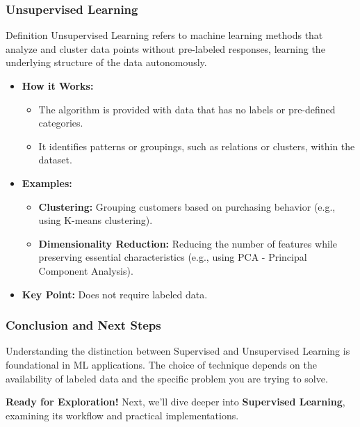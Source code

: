 \documentclass[aspectratio=169]{beamer}
\begin{document}
\begin{frame}[fragile]
    \frametitle{Unsupervised Learning}
    \begin{block}{Definition}
        Unsupervised Learning refers to machine learning methods that analyze and cluster data points without pre-labeled responses, learning the underlying structure of the data autonomously.
    \end{block}
    
    \begin{itemize}
        \item \textbf{How it Works:}
        \begin{itemize}
            \item The algorithm is provided with data that has no labels or pre-defined categories.
            \item It identifies patterns or groupings, such as relations or clusters, within the dataset.
        \end{itemize}
        
        \item \textbf{Examples:}
        \begin{itemize}
            \item \textbf{Clustering:} Grouping customers based on purchasing behavior (e.g., using K-means clustering).
            \item \textbf{Dimensionality Reduction:} Reducing the number of features while preserving essential characteristics (e.g., using PCA - Principal Component Analysis).
        \end{itemize}
        
        \item \textbf{Key Point:} Does not require labeled data.
    \end{itemize}
\end{frame}

\begin{frame}[fragile]
    \frametitle{Conclusion and Next Steps}
    Understanding the distinction between Supervised and Unsupervised Learning is foundational in ML applications. The choice of technique depends on the availability of labeled data and the specific problem you are trying to solve.

    \textbf{Ready for Exploration!} Next, we'll dive deeper into \textbf{Supervised Learning}, examining its workflow and practical implementations.
    
\end{frame}
\end{document}

